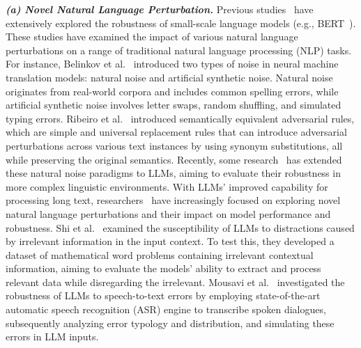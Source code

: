 \textit{\textbf{(a) Novel Natural Language Perturbation.}}
Previous studies~\cite{jiang2019avoiding,niu2018adversarial, li2018textbugger,nie2020adversarial,belinkov2017synthetic,gao2018black,alzantot2018generating,ribeiro2018semantically,jia2017adversarial} have extensively explored the robustness of small-scale language models (e.g., BERT~\cite{bert}). These studies have examined the impact of various natural language perturbations on a range of traditional natural language processing (NLP) tasks. For instance, Belinkov et al.~\cite{belinkov2017synthetic} introduced two types of noise in neural machine translation models: natural noise and artificial synthetic noise. Natural noise originates from real-world corpora and includes common spelling errors, while artificial synthetic noise involves letter swaps, random shuffling, and simulated typing errors. Ribeiro et al.~\cite{ribeiro2018semantically} introduced semantically equivalent adversarial rules, which are simple and universal replacement rules that can introduce adversarial perturbations across various text instances by using synonym substitutions, all while preserving the original semantics. Recently, some research~\cite{wang2023decodingtrust,liu2023trustworthy,asl2024semantic,zhuo2023robustness} has extended these natural noise paradigms to LLMs, aiming to evaluate their robustness in more complex linguistic environments. With LLMs’ improved capability for processing long text, researchers~\cite{shi2023large,mousavi2024llms,huang2025contextualdistraction} have increasingly focused on exploring novel natural language perturbations and their impact on model performance and robustness. Shi et al.~\cite{shi2023large} examined the susceptibility of LLMs to distractions caused by irrelevant information in the input context. To test this, they developed a dataset of mathematical word problems containing irrelevant contextual information, aiming to evaluate the models’ ability to extract and process relevant data while disregarding the irrelevant.
Mousavi et al.~\cite{mousavi2024llms} investigated the robustness of LLMs to speech-to-text errors by employing state-of-the-art automatic speech recognition (ASR) engine to transcribe spoken dialogues, subsequently analyzing error typology and distribution, and simulating these errors in LLM inputs.


